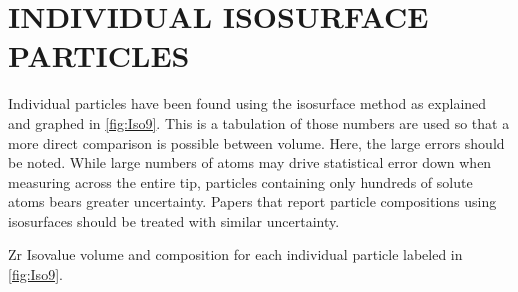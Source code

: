 \chapter{INDIVIDUAL ISOSURFACE PARTICLES}

Individual particles have been found using the isosurface method as explained and graphed in \ref{fig:Iso9}. This is a tabulation of those numbers are used so that a more direct comparison is possible between volume. Here, the large errors should be noted. While large numbers of atoms may drive statistical error down when measuring across the entire tip, particles containing only hundreds of solute atoms bears greater uncertainty. Papers that report particle compositions using isosurfaces should be treated with similar uncertainty.

\begin{table}[]
	\caption{Zr Isovalue volume and composition for each individual particle labeled in \ref{fig:Iso9}.}
	
	\label{tab:Isoapp1}
\end{table}


